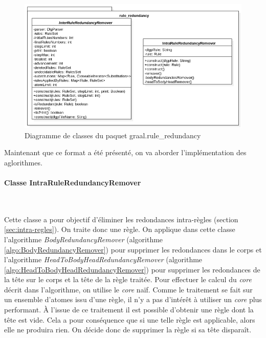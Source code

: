   

        \begin{figure}[!h]
        \centering
        \includegraphics[width=\textwidth]{pictures/RedondanceDiagrammeClasse.png}
        \caption{Diagramme de classes du paquet graal.rule\_redundancy}
        \label{fig:dclasse_rule_redundancy}
        \end{figure}
    Maintenant que ce format a été présenté, on va aborder l'implémentation des aglorithmes.

    \paragraph{Classe IntraRuleRedundancyRemover}\ 
        \par Cette classe a pour objectif d'éliminer les redondances intra-règles (section \ref{sec:intra-regles}). On traite donc une règle. On applique dans cette classe l'algorithme \textit{BodyRedundancyRemover} (algorithme \ref{algo:BodyRedundancyRemover}) pour supprimer les redondances dans le corps et l'algorithme \textit{HeadToBodyHeadRedundancyRemover} (algorithme \ref{algo:HeadToBodyHeadRedundancyRemover}) pour supprimer les redondances de la tête sur le corps et la tête de la règle traitée. Pour effectuer le calcul du \textit{core} décrit dans l'algorithme, on utilise le \textit{core} naïf. Comme le traitement se fait sur un ensemble d'atomes issu d'une règle, il n'y a pas d'intérêt à utiliser un \textit{core} plus performant. À l'issue de ce traitement il est possible d'obtenir une règle dont la tête est vide. Cela a pour conséquence que si une telle règle est applicable, alors elle ne produira rien. On décide donc de supprimer la règle si sa tête disparaît. 
         
